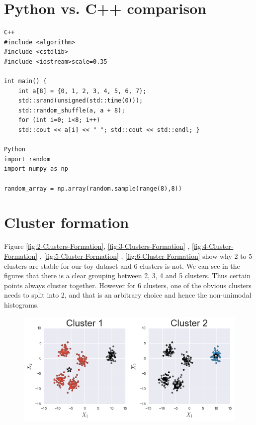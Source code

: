 \documentclass[10pt,twocolumn,letterpaper]{article}
\begin{document}
\clearpage
\begin{appendices}

\section{Python vs. C++ comparison} \label{py-compare} 

\begin{verbatim}
C++
#include <algorithm>
#include <cstdlib>
#include <iostream>scale=0.35

int main() {
    int a[8] = {0, 1, 2, 3, 4, 5, 6, 7};     
	std::srand(unsigned(std::time(0)));
    std::random_shuffle(a, a + 8);
    for (int i=0; i<8; i++)         
	std::cout << a[i] << " "; std::cout << std::endl; }

Python 
import random
import numpy as np

random_array = np.array(random.sample(range(8),8))
\end{verbatim}

\section{Cluster formation} \label{cluster-formation}

Figure \ref{fig:2-Clusters-Formation}, \ref{fig:3-Clusters-Formation}
, \ref{fig:4-Cluster-Formation} , \ref{fig:5-Cluster-Formation}
, \ref{fig:6-Cluster-Formation} show why 2 to 5 clusters are stable
for our toy dataset and 6 clusters is not. We can see in the figures
that there is a clear grouping between 2, 3, 4 and 5 clusters. Thus
certain points always cluster together. However for 6 clusters, one
of the obvious clusters needs to split into 2, and that is an arbitrary
choice and hence the non-unimodal histograms.

\begin{figure}[htbp] 
\begin{center}
\includegraphics[scale=0.45]{figure/2_formation.png}
\end{center}


\end{figure}
\end{appendices}
\end{document}

